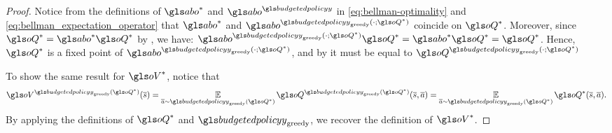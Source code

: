 \subsection{}
\label{proof-prop:greedy_optimal}

\begin{proof}
    Notice from the definitions of $\abo^{*}$ and $\abo^{\budgetedpolicy}$ in \eqref{eq:bellman-optimality} and \eqref{eq:bellman_expectation_operator} that $\abo^{*}$ and $\abo^{\budgetedpolicy_\text{greedy}(\cdot;\oQ^*)}$ coincide on $\oQ^*$. Moreover, since $\oQ^* = \abo^{*}\oQ^*$ by , we have: $\abo^{\budgetedpolicy_\text{greedy}(\cdot;\oQ^*)} \oQ^* = \abo^{*} \oQ^* = \oQ^*
    $.
    Hence, $\oQ^*$ is a fixed point of $\abo^{\budgetedpolicy_\text{greedy}(\cdot;\oQ^*)}$, and by  it must be equal to $\oQ^{\budgetedpolicy_\text{greedy}(\cdot;\oQ^*)}$

    To show the same result for $\oV^*$, notice that
    \begin{equation*}
        \oV^{\budgetedpolicy_\text{greedy}(\oQ^*)}(\os) = \expectedvalueover{\oa\sim\budgetedpolicy_\text{greedy}(\oQ^*)}\oQ^{\budgetedpolicy_\text{greedy}(\oQ^*)}(\os,\oa) = \expectedvalueover{\oa\sim\budgetedpolicy_\text{greedy}(\oQ^*)}\oQ^*(\os,\oa).
    \end{equation*}
    By applying the definitions of $\oQ^*$ and $\budgetedpolicy_\text{greedy}$, we recover the definition of $\oV^*$.
\end{proof}

\subsection{}
\label{proof-thm:contraction}

